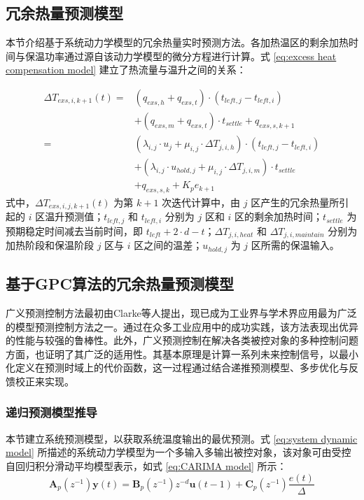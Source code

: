 \subsection{冗余热量预测模型}
本节介绍基于系统动力学模型的冗余热量实时预测方法。各加热温区的剩余加热时间与保温功率通过源自该动力学模型的微分方程进行计算。式 \ref{eq:excess heat compensation model} 建立了热流量与温升之间的关系：\par
\begin{equation}
    \begin{aligned}
        \Delta T_{exs,i,k+1}(t) 
        = &(q_{exs,h}+q_{exs,t})\cdot (t_{left,j}-t_{left,i})\\
        &+ (q_{exs,m}+q_{exs,t})\cdot t_{settle} + q_{exs,s,k+1}\\
        = &(\lambda_{i,j} \cdot u_{j} + \mu_{i,j} \cdot \Delta T_{j,i,h})\cdot (t_{left,j}-t_{left,i})\\
        &+ (\lambda_{i,j} \cdot u_{hold,j} + \mu_{i,j} \cdot \Delta T_{j,i,m})\cdot t_{settle}\\
        &+ q_{exs,s,k} + K_p e_{k+1}
    \end{aligned}
    \label{eq:excess heat compensation model}
\end{equation}
式中，$\Delta T_{exs,i,j,k+1}(t)$ 为第 $k+1$ 次迭代计算中，由 $j$ 区产生的冗余热量所引起的 $i$ 区温升预测值；$t_{left,j}$ 和 $t_{left,i}$ 分别为 $j$ 区和 $i$ 区的剩余加热时间；$t_{settle}$ 为预期稳定时间减去当前时间，即 $t_{left}+2\cdot d -t$；$\Delta T_{j,i,heat}$ 和 $\Delta T_{j,i,maintain}$ 分别为加热阶段和保温阶段 $j$ 区与 $i$ 区之间的温差；$u_{hold,j}$ 为 $j$ 区所需的保温输入。\par

\subsection{基于GPC算法的冗余热量预测模型}
广义预测控制方法最初由Clarke等人\cite{Clarke_1987_generalized}提出，现已成为工业界与学术界应用最为广泛的模型预测控制方法之一。通过在众多工业应用中的成功实践，该方法表现出优异的性能与较强的鲁棒性。此外，广义预测控制在解决各类被控对象的多种控制问题方面，也证明了其广泛的适用性。其基本原理是计算一系列未来控制信号，以最小化定义在预测时域上的代价函数，这一过程通过结合递推预测模型、多步优化与反馈校正来实现。\par

\subsubsection{递归预测模型推导}
本节建立系统预测模型，以获取系统温度输出的最优预测。式 \ref{eq:system dynamic model} 所描述的系统动力学模型为一个多输入多输出被控对象，该对象可由受控自回归积分滑动平均模型表示，如式 \ref{eq:CARIMA model} 所示：
\begin{equation}
    \boldsymbol{A}_p\left(z^{-1}\right)\boldsymbol{y}(t) = \boldsymbol{B}_p\left(z^{-1}\right)z^{-d}\boldsymbol{u}(t-1)+\boldsymbol{C}_p\left(z^{-1}\right)\frac{e(t)}{\Delta}
    \label{eq:CARIMA model}
\end{equation}

